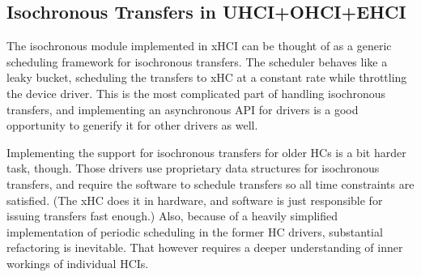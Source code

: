 \subsection{Isochronous Transfers in UHCI+OHCI+EHCI}

The isochronous module implemented in xHCI can be thought of as a generic scheduling
framework for isochronous transfers. The scheduler behaves like a leaky bucket,
scheduling the transfers to xHC at a constant rate while throttling the device
driver. This is the most complicated part of handling isochronous transfers,
and implementing an asynchronous API for drivers is a good opportunity to
generify it for other drivers as well.

Implementing the support for isochronous transfers for older HCs is a bit
harder task, though. Those drivers use proprietary data structures for isochronous
transfers, and require the software to schedule transfers so all time
constraints are satisfied. (The xHC does it in hardware, and software is just
responsible for issuing transfers fast enough.) Also, because of a heavily
simplified implementation of periodic scheduling in the former HC drivers,
substantial refactoring is inevitable. That however requires a deeper
understanding of inner workings of individual HCIs.
